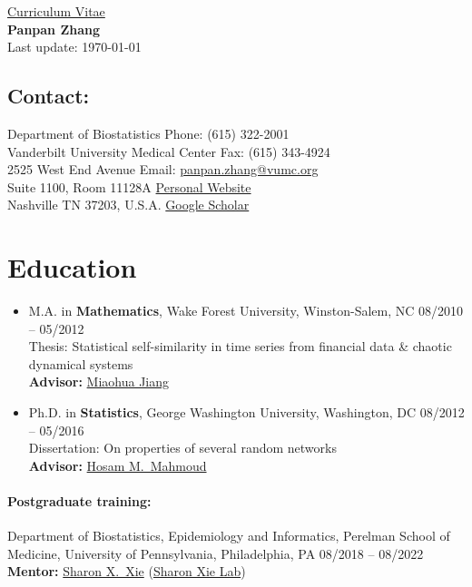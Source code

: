 \documentclass[12pt]{article}
\begin{document}
	
	\begin{center}
		\huge{
			\underline{Curriculum Vitae}
		}
		\vspace{10pt} \\
		\Large{
			\rmfamily
			\textbf{Panpan Zhang}
		}
		\vspace{10pt} \\
		\small{Last update: \today}	
	\end{center}
	\vspace{10pt}
	
	\subsection*{Contact:}
	Department of Biostatistics \hfill Phone: (615) 322-2001 \\
	Vanderbilt University Medical Center \hfill Fax: (615) 343-4924 
	\\
	2525 West End Avenue \hfill Email: \href{mailto:panpan.zhang@vumc.org}
	{panpan.zhang@vumc.org} \\
	Suite 1100, Room 11128A \hfill \href{https://panpan-zhang.com/}{Personal Website} \\
	Nashville TN 37203, U.S.A. \hfill \href{https://scholar.google.com/citations?user=XMgB5OYAAAAJ&hl=en}{Google Scholar}
	
	\section*{Education}
	\begin{itemize}
		\item M.A. in \textbf{Mathematics}, Wake Forest University, Winston-Salem, NC \hfill 08/2010 -- 05/2012 \\
		Thesis: Statistical self-similarity in time series from financial data \& chaotic dynamical systems \\
		{\bf Advisor:} \href{https://math.wfu.edu/jiang}{Miaohua Jiang}
		\item Ph.D. in \textbf{Statistics}, George Washington University, Washington, DC \hfill 08/2012 -- 05/2016 \\
		Dissertation: On properties of several random networks \\
		{\bf Advisor:} 
		\href{https://statistics.columbian.gwu.edu/hosam-m-mahmoud}
		{Hosam M.\ Mahmoud}
	\end{itemize}
	\paragraph{Postgraduate training:} Department of 
	Biostatistics, Epidemiology and Informatics, Perelman School of Medicine, University of Pennsylvania, Philadelphia, PA \hfill 08/2018 -- 08/2022 \\
	{\bf Mentor:} 
	\href{https://www.med.upenn.edu/apps/faculty/index.php/g275/
		p9964}{Sharon X.\ Xie} 
	(\href{https://sites.google.com/view/sharonxielab/
		home?authuser=0}{Sharon Xie Lab})
	
\end{document}
